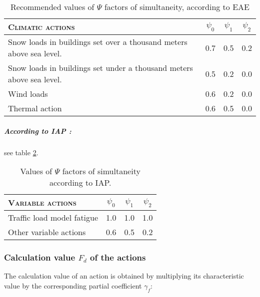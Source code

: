 \begin{table}
\begin{center}
\begin{small}
\begin{tabular}{|l|c|c|c|}
\hline
\textsc{Climatic actions} & $\psi_{0}$ & $\psi_{1}$ & $\psi_{2}$ \\
\hline
\multicolumn{1}{|p{8cm}|}{Snow loads in buildings set over a thousand meters above sea level.} & 0.7 & 0.5 & 0.2 \\
\multicolumn{1}{|p{8cm}|}{Snow loads in buildings set under a thousand meters above sea level.} & 0.5 & 0.2 & 0.0 \\
Wind loads & 0.6 & 0.2 & 0.0 \\
Thermal action & 0.6 & 0.5 & 0.0 \\
\hline
\end{tabular}
\end{small}
\caption{Recommended values of $\Psi$ factors of simultaneity, according to EAE} \label{tb_coefs_psi_1EAE}
\end{center}
\end{table}

\subparagraph{According to IAP \cite{IAP}:} see table \ref{tb_coefs_psi_IAP}.

\begin{table}
\begin{center}
\begin{small}
\begin{tabular}{|l|c|c|c|}
\hline
\textsc{Variable actions} & $\psi_{0}$ & $\psi_{1}$ & $\psi_{2}$ \\
\hline
Traffic load model fatigue & 1.0 & 1.0 & 1.0 \\
Other variable actions & 0.6 & 0.5 & 0.2 \\
\hline
\end{tabular}
\end{small}
\caption{Values of $\Psi$ factors of simultaneity according to IAP.} \label{tb_coefs_psi_IAP}
\end{center}
\end{table}

\subsubsection{Calculation value $F_d$ of the actions} \label{sc_valor_calculo_acc}
The calculation value of an action is obtained by multiplying its characteristic value by the corresponding partial coefficient $\gamma_f$:

